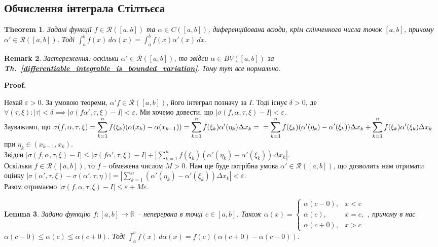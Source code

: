 \documentclass[a4paper, 10pt]{article}
\makeatletter
\def\qed{$\blacksquare$}
\theoremstyle{theoremdd}
\newtheorem{theorem}{Theorem}[subsection]
\theoremstyle{theoremdd}
\theoremstyle{theoremdd}
\theoremstyle{theoremdd}
\theoremstyle{theoremdd}
\theoremstyle{theoremdd}
\theoremstyle{theoremdd}
\newtheorem{remark}[theorem]{Remark}
\theoremstyle{theoremdd}
\newtheorem{lemma}[theorem]{Lemma}
\theoremstyle{theoremdd}
\newcommand\thref[1]{\textbf{Th.~\ref{#1}}}
\renewenvironment{proof}[1][Proof.\\]{\par
\pushQED{\hfill \qed}%
\normalfont \topsep6\p@\@plus6\p@\relax
\trivlist
\item\relax
{\bfseries
#1\@addpunct{.}}\hspace\labelsep\ignorespaces
}{%
\popQED\endtrivlist\@endpefalse
}
\makeatother
\begin{document}
\subsection{Обчислення інтеграла Стілтьєса}
\begin{theorem}
Задані функції $f \in \mathcal{R}([a,b])$ та $\alpha \in C([a,b])$, диференційована всюди, крім скінченного числа точок $[a,b]$, причому $\alpha' \in \mathcal{R}([a,b])$. Тоді $\displaystyle\int_a^b f(x)\,d\alpha(x) = \int_a^b f(x)\alpha'(x)\,dx$.
\end{theorem}

\begin{remark}
Застереження: оскільки $\alpha' \in \mathcal{R}([a,b])$, то звідси $\alpha \in BV([a,b])$ за \thref{differentiable_integrable_is_bounded_variation}. Тому тут все нормально.
\end{remark}

\begin{proof}
Нехай $\varepsilon > 0$. За умовою теореми, $\alpha' f \in \mathcal{R}([a,b])$, його інтеграл позначу за $I$. Тоді існує $\delta > 0$, де $\forall (\tau,\xi): |\tau| < \delta \implies |\sigma(f \alpha', \tau, \xi) - I| < \varepsilon$. Ми хочемо довести, що $|\sigma(f,\alpha,\tau,\xi) - I| < \varepsilon$.\\
Зауважимо, що $\sigma(f,\alpha,\tau,\xi) = \displaystyle\sum_{k=1}^n f(\xi_k) (\alpha(x_{k}) - \alpha(x_{k-1})) = \sum_{k=1}^n f(\xi_k) \alpha'(\eta_k) \Delta x_k = \\ =  \sum_{k=1}^n f(\xi_k) (\alpha'(\eta_k) - \alpha'(\xi_k)) \Delta x_k + \sum_{k=1}^n f(\xi_k) \alpha'(\xi_k) \Delta x_k$ при $\eta_k \in (x_{k-1},x_k)$.\\
Звідси $|\sigma(f,\alpha,\tau,\xi) - I| \leq |\sigma (f\alpha', \tau,\xi) - I| + \displaystyle\left|\sum_{k=1}^n f(\xi_k) (\alpha'(\eta_k) - \alpha'(\xi_k)) \Delta x_k\right|$.\\
Оскільки $f \in \mathcal{R}([a,b])$, то $f$ -- обмежена числом $M > 0$. Нам ще буде потрібна умова $\alpha' \in \mathcal{R}([a,b])$, що дозволить нам отримати оцінку $|\sigma(\alpha',\tau,\xi) - \sigma(\alpha',\tau,\eta)| = \displaystyle\left| \sum_{k=1}^n (\alpha'(\eta_k) - \alpha'(\xi_k)) \Delta x_k \right| < \varepsilon$.\\
Разом отримаємо $|\sigma(f,\alpha,\tau,\xi) - I| \leq \varepsilon + M \varepsilon$.
\end{proof}

\begin{lemma}
Задано функцію $f \colon [a,b] \to \mathbb{R}$ -- неперервна в точці $c \in [a,b]$. Також $\alpha(x) = \begin{cases} \alpha(c-0), & x < c \\ \alpha(c), & x = c, \\ \alpha(c+0), & x > c \end{cases}$, причому в нас $\alpha(c-0) \leq \alpha(c) \leq \alpha(c+0)$. Тоді $\displaystyle\int_a^b f(x)\,d\alpha(x) = f(c)(\alpha(c+0) - \alpha(c-0))$.
\end{lemma}
\end{document}

